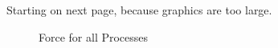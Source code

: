 \documentclass[12 pt]{scrartcl}
\begin{document}
\newpage
{}
\renewcommand\refname{Bibliography}


\newpage
\appendix
{}

Starting on next page, because graphics are too large.

\begin{figure}[p]
  \vspace*{-1cm}
  \caption{Force for all Processes}
  \label{fig:all-force}
\end{figure}
\end{document}
